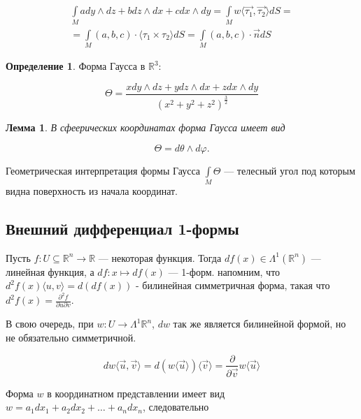 \documentclass[a5paper]{article}
\newcounter{through}
\theoremstyle{plain}
\newtheorem{lemma}[through]{Лемма}
\theoremstyle{definition}
\newtheorem{definition}[through]{Определение}
\numberwithin{through}{section}
\numberwithin{equation}{section}
\begin{document}
\begin{multline*}
	\int\limits_{M} a dy \wedge dz + b dz \wedge dx + c dx \wedge dy = \int\limits_{M} w \langle \vec{\tau_1}, \vec{\tau_2} \rangle dS = \\ = \int\limits_{M} (a, b, c) \cdot \langle \tau_1 \times \tau_2 \rangle dS = \int\limits_{M} (a, b, c) \cdot \vec{n} dS
\end{multline*}

\begin{definition}
	Форма Гаусса в $\mathbb{R}^3$:
	
	\begin{equation*}
		\Theta = \frac{x dy \wedge dz + y dz \wedge dx + z dx \wedge dy}{(x^2 + y^2 + z^2)^{\frac{3}{2}}}
	\end{equation*}
\end{definition}

\begin{lemma}
	В сфеерических координатах форма Гаусса имеет вид
	
	\begin{equation*}
	\Theta = d\theta \wedge d\varphi.
	\end{equation*}
\end{lemma}

Геометрическая интерпретация формы Гаусса $\int\limits_{M} \Theta$ --- телесный угол под которым видна поверхность из начала координат.

\subsection{Внешний дифференциал 1-формы}

Пусть $f : U \subseteq \mathbb{R}^n \to \mathbb{R}$ --- некоторая функция. Тогда $d f(x) \in \Lambda^1(\mathbb{R}^n)$ --- линейная функция, а $df : x \mapsto df(x)$ --- 1-форм. напомним, что $d^2 f(x) \langle u, v \rangle = d (d f(x)) $ - билинейная симметричная форма, такая что $d^2 f(x) = \frac{\partial^2 f}{\partial u \partial v}$.

В свою очередь, при $w : U \to \Lambda^1 {\mathbb{R}^n}$, $dw$ так же является билинейной формой, но не обязательно симметричной.

\begin{equation*}
dw \langle \vec{u}, \vec{v} \rangle = d (w \langle \vec{u} \rangle ) \langle \vec{v} \rangle = \frac{\partial}{\partial \vec{v}} w \langle \vec{u} \rangle
\end{equation*}

Форма $w$ в координатном представлении имеет вид $w=a_1dx_1 + a_2 dx_2 + \ldots + a_n dx_n$, следовательно
\end{document}
